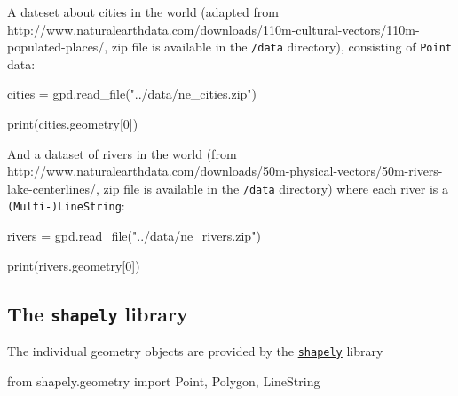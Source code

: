 \documentclass[
  letterpaper,
  DIV=11,
  numbers=noendperiod]{scrreprt}
\newenvironment{Shaded}{\begin{snugshade}}{\end{snugshade}}
\newcommand{\BuiltInTok}[1]{\textcolor[rgb]{0.00,0.23,0.31}{#1}}
\newcommand{\DecValTok}[1]{\textcolor[rgb]{0.68,0.00,0.00}{#1}}
\newcommand{\ImportTok}[1]{\textcolor[rgb]{0.00,0.46,0.62}{#1}}
\newcommand{\NormalTok}[1]{\textcolor[rgb]{0.00,0.23,0.31}{#1}}
\newcommand{\OperatorTok}[1]{\textcolor[rgb]{0.37,0.37,0.37}{#1}}
\newcommand{\StringTok}[1]{\textcolor[rgb]{0.13,0.47,0.30}{#1}}
\begin{document}
A dateset about cities in the world (adapted from
http://www.naturalearthdata.com/downloads/110m-cultural-vectors/110m-populated-places/,
zip file is available in the \texttt{/data} directory), consisting of
\texttt{Point} data:

\begin{Shaded}
\begin{Highlighting}[]
\NormalTok{cities }\OperatorTok{=}\NormalTok{ gpd.read\_file(}\StringTok{"../data/ne\_cities.zip"}\NormalTok{)}
\end{Highlighting}
\end{Shaded}

\begin{Shaded}
\begin{Highlighting}[]
\BuiltInTok{print}\NormalTok{(cities.geometry[}\DecValTok{0}\NormalTok{])}
\end{Highlighting}
\end{Shaded}

And a dataset of rivers in the world (from
http://www.naturalearthdata.com/downloads/50m-physical-vectors/50m-rivers-lake-centerlines/,
zip file is available in the \texttt{/data} directory) where each river
is a \texttt{(Multi-)LineString}:

\begin{Shaded}
\begin{Highlighting}[]
\NormalTok{rivers }\OperatorTok{=}\NormalTok{ gpd.read\_file(}\StringTok{"../data/ne\_rivers.zip"}\NormalTok{)}
\end{Highlighting}
\end{Shaded}

\begin{Shaded}
\begin{Highlighting}[]
\BuiltInTok{print}\NormalTok{(rivers.geometry[}\DecValTok{0}\NormalTok{])}
\end{Highlighting}
\end{Shaded}

\subsection{\texorpdfstring{The \texttt{shapely}
library}{The shapely library}}\label{the-shapely-library}

The individual geometry objects are provided by the
\href{https://shapely.readthedocs.io/en/stable/}{\texttt{shapely}}
library

\begin{Shaded}
\begin{Highlighting}[]
\ImportTok{from}\NormalTok{ shapely.geometry }\ImportTok{import}\NormalTok{ Point, Polygon, LineString}
\end{Highlighting}
\end{Shaded}
\end{document}
